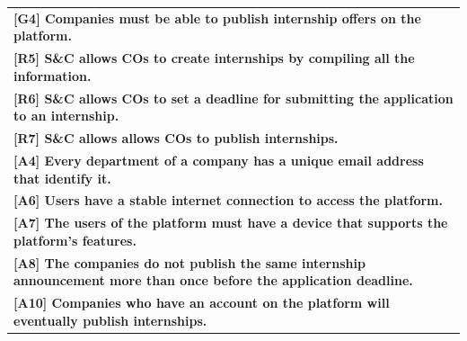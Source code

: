 \begin{center}
    \begin{tabular}{|p{37em}|}
        \rowcolor{bluepoli!40} %
        \hline
        \textbf{[G4] Companies must be able to publish internship offers on the platform.} \\
        \rowcolor{bluepoli!15}
        \textbf{[R5] S\&C allows COs to create internships by compiling all the information.} \\
        \rowcolor{bluepoli!15}
        \textbf{[R6] S\&C allows COs to set a deadline for submitting the application to an internship.}\\
        \rowcolor{bluepoli!15}
        \textbf{[R7] S\&C allows allows COs to publish internships.}\\
        \textbf{[A4] Every department of a company has a unique email address that identify it.}\\
        \textbf{[A6] Users have a stable internet connection to access the platform.}\\
        \textbf{[A7] The users of the platform must have a device that supports the platform's features.}\\
        \textbf{[A8] The companies do not publish the same internship announcement more than once before the application deadline.}\\
        \textbf{[A10] Companies who have an account on the platform will eventually publish internships.}\\
        \hline
    \end{tabular}
\end{center}

